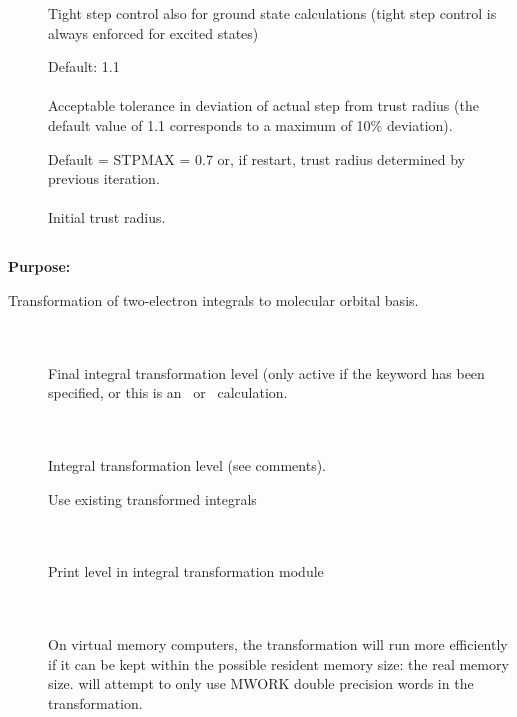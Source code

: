 \begin{description}
\item[]
  Tight step control also for ground state calculations
  (tight step control is always enforced for excited states)

\item[]
  Default: 1.1\\
   \\
  Acceptable tolerance in deviation of actual step from trust radius
  (the default value of 1.1 corresponds to a maximum of 10\% deviation).

\item[]
  Default = STPMAX = 0.7 or, if restart, trust radius determined by previous
            iteration.\\
   \\
  Initial trust radius.

\end{description}


\pagebreak[3]
\subsection{\label{ref-trainp}}

{\bf Purpose:}

Transformation of two-electron
integrals to molecular orbital
basis.

\begin{description}
\item[] \ \\
   \\
  Final integral transformation level (only active if the keyword
   has been specified, or this is an \aba\ or
  \resp\ calculation.

\item[] \ \\
   \\
  Integral transformation level (see comments).

\item[]
  Use existing transformed integrals

\item[] \ \\
   \\
  Print level in integral transformation module

\item[] \ \\
   \\
  On virtual memory computers, the transformation will run more
  efficiently if it can be kept within the possible resident memory
  size: the real memory size.  {\sir} will attempt to only use MWORK
  double precision words in the transformation.
\end{description}


